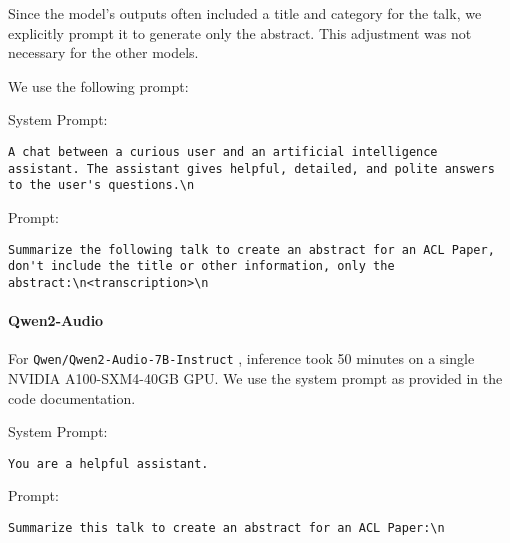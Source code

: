 Since the model’s outputs often included a title and category for the talk, we explicitly prompt it to generate only the abstract. This adjustment was not necessary for the other models.

We use the following prompt:

\lstset{basicstyle=\small} 
\noindent System Prompt:
\begin{lstlisting}[breaklines=true, breakindent=0pt]
A chat between a curious user and an artificial intelligence assistant. The assistant gives helpful, detailed, and polite answers to the user's questions.\n
\end{lstlisting}
Prompt:
\begin{lstlisting}[breaklines=true, breakindent=0pt]
Summarize the following talk to create an abstract for an ACL Paper, don't include the title or other information, only the abstract:\n<transcription>\n
\end{lstlisting}

\paragraph{Qwen2-Audio}
For \texttt{Qwen/\-Qwen2-\-Audio-\-7B-\-Instruct} \citep{chu2024qwen2audiotechnicalreport}, inference took 50 minutes on a single NVIDIA A100-SXM4-40GB GPU.
We use the system prompt as provided in the code documentation.

\lstset{basicstyle=\small} 
\noindent System Prompt:
\begin{lstlisting}[breaklines=true, breakindent=0pt]
You are a helpful assistant.
\end{lstlisting}
Prompt:
\begin{lstlisting}[breaklines=true, breakindent=0pt]
Summarize this talk to create an abstract for an ACL Paper:\n
\end{lstlisting}



